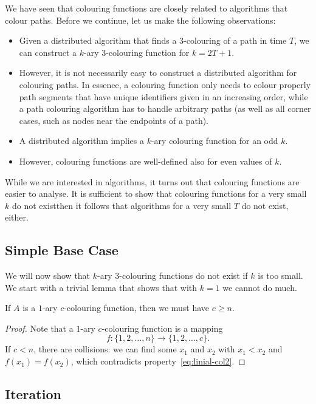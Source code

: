 We have seen that colouring functions are closely related to algorithms that colour paths. Before we continue, let us make the following observations:
\begin{itemize}
    \item Given a distributed algorithm that finds a $3$-colouring of a path in time $T$, we can construct a $k$-ary $3$-colouring function for $k = 2T+1$.
    \item However, it is not necessarily easy to construct a distributed algorithm for colouring paths. In essence, a colouring function only needs to colour properly path segments that have unique identifiers given in an increasing order, while a path colouring algorithm has to handle arbitrary paths (as well as all corner cases, such as nodes near the endpoints of a path).
    \item A distributed algorithm implies a $k$-ary colouring function for an odd $k$.
    \item However, colouring functions are well-defined also for even values of $k$.
\end{itemize}
While we are interested in algorithms, it turns out that colouring functions are easier to analyse. It is sufficient to show that colouring functions for a very small $k$ do not exist\mydash then it follows that algorithms for a very small $T$ do not exist, either.


\subsection{Simple Base Case}

We will now show that $k$-ary $3$-colouring functions do not exist if $k$ is too small. We start with a trivial lemma that shows that with $k = 1$ we cannot do much.

\begin{lemma}\label{lem:linial-base}
    If $A$ is a $1$-ary $c$-colouring function, then we must have $c \ge n$.
\end{lemma}
\begin{proof}
    Note that a $1$-ary $c$-colouring function is a mapping
    \[
        f\colon \{1,2,\dotsc,n\} \to \{1,2,\dotsc,c\}.
    \]
    If $c < n$, there are collisions: we can find some $x_1$ and $x_2$ with $x_1 < x_2$ and $f(x_1) = f(x_2)$, which contradicts property~\eqref{eq:linial-col2}.
\end{proof}


\subsection{Iteration}

